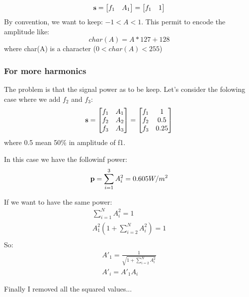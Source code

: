 \documentclass{article}
\begin{document}
\begin{equation}
\mathbf{s} = \begin{bmatrix}
f_1 & A_1
\end{bmatrix}
=
\begin{bmatrix}
f_1 & 1
\end{bmatrix}
\end{equation}
By convention, we want to keep: $-1<A<1$. This permit to encode the amplitude like:
\begin{equation}
char(A)=A*127+128
\end{equation}
where char(A) is a character ($0<char(A)<255$)

\subsubsection*{For more harmonics}

The problem is that the signal power as to be keep. Let's consider the folowing case where we add $f_2$ and $f_3$:
\begin{align}
\mathbf{s}
= \begin{bmatrix}
f_1 & A_1 \\
f_2 & A_2 \\
f_3 & A_3 \\
\end{bmatrix}
= \begin{bmatrix}
f_1 & 1 \\
f_2 & 0.5 \\
f_3 & 0.25 \\
\end{bmatrix} \nonumber \\ 
\end{align}
where 0.5 mean 50\% in amplitude of f1.

In this case we have the followinf power:
\begin{equation}
\mathbf{p} = \sum_{i=1}^3 A_i^2 = 0.605 W/m^2
\end{equation}

If we want to have the same power:
\begin{align}
\sum_{i=1}^N A_i^2 =1 \\
A_1^2 (1+\sum_{i=2}^N A_i^2) =1 \\
\end{align}
So:
\begin{align}
A'_1=\frac{1}{\sqrt{1+\sum_{i=2}^N A_i^2}} \\
A'_i = A'_1  A_i
\end{align}

Finally I removed all the squared values...
\end{document}
